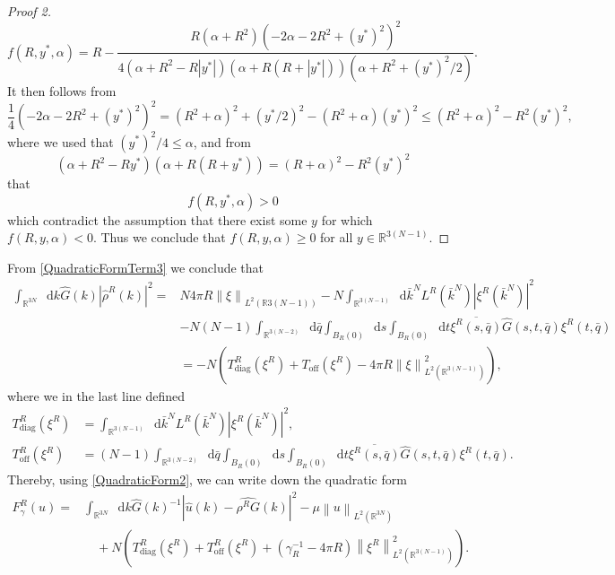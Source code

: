 \documentclass[a4paper,11pt]{article}
\newcommand{\norm}[1]{\left\lVert #1 \right\rVert}
\newcommand{\abs}[1]{\left\lvert #1 \right\rvert}
\newcommand*\diff{\mathop{}\!\mathrm{d}}
\newcommand{\R}{\mathbb{R}}
\numberwithin{equation}{section}
\begin{document}
\begin{proof}[Proof 2]
\begin{equation}
	f(R,y^*,\alpha)=R-\frac{R \left(\alpha +R^2\right) \left(-2 \alpha -2 R^2+(y^*)^2\right)^2}{4 \left(\alpha +R^2-R \abs{y^*}\right) (\alpha +R (R+\abs{y^*})) \left( \alpha + R^2+(y^*)^2/2\right)}.
	\end{equation}
	It then follows from \begin{equation}
	\frac{1}{4}\left(-2 \alpha -2 R^2+(y^*)^2\right)^2=(R^2+\alpha)^2+(y^*/2)^2-(R^2+\alpha)(y^*)^2\leq(R^2+\alpha)^2-R^2(y^*)^2,
	\end{equation}
	where we used that $ (y^*)^2/4\leq\alpha $, and from \begin{equation}
	\left(\alpha +R^2-R y^*\right) (\alpha +R (R+y^*))=(R+\alpha)^2-R^2(y^*)^2
	\end{equation}
	that \begin{equation}
	f(R,y^*,\alpha)> 0
	\end{equation}
	which contradict the assumption that there exist some $ y $ for which $ f(R,y,\alpha)<0 $. Thus we conclude that $ f(R,y,\alpha)\geq0 $ for all $ y\in\R^{3(N-1)} $.
\end{proof}
\vspace{0.5cm}
From \eqref{QuadraticFormTerm3} we conclude that \begin{equation}
\begin{aligned}
\int_{\R^{3N}}\diff k\hat{G}(k)\abs{\hat{\rho}^R(k)}^2=&N4\pi R \norm{\xi}_{L^2(\R{3(N-1)})}-N\int_{\R^{3(N-1)}}\diff \bar{k}^N L^R(\bar{k}^N) \abs{\xi^R(\bar{k}^N)}^2\\&-N(N-1)\int_{\R^{3(N-2)}}\diff \bar{q}\int_{B_R(0)}\diff s\int_{B_R(0)}\diff t \overline{\xi^R(s,\bar{q})}\hat{G}(s,t,\bar{q})\xi^R(t,\bar{q})\\
&= -N\left(T_{\text{diag}}^R(\xi^R)+T_{\text{off}}(\xi^R)-4\pi R\norm{\xi}_{L^2(\R^{3(N-1)})}^2\right),
\end{aligned}
\end{equation}
where we in the last line defined\begin{equation}
\begin{aligned}
T^R_{\text{diag}}(\xi^R)&=\int_{\R^{3(N-1)}}\diff \bar{k}^N L^R(\bar{k}^N) \abs{\xi^R(\bar{k}^N)}^2,\\
T^R_{\text{off}}(\xi^R)&=(N-1)\int_{\R^{3(N-2)}}\diff \bar{q}\int_{B_R(0)}\diff s\int_{B_R(0)}\diff t \overline{\xi^R(s,\bar{q})}\hat{G}(s,t,\bar{q})\xi^R(t,\bar{q}).
\end{aligned}
\end{equation}
Thereby, using \eqref{QuadraticForm2}, we can write down the quadratic form\begin{equation}
\begin{aligned}
F_\gamma^R(u)=&\int_{\R^{3N}}\diff k \hat{G}(k)^{-1}|\hat{u}(k)-\widehat{\rho^R G}(k)|^2-\mu\norm{u}_{L^2(\R^{3N})}\\&\quad+N\left(T^R_{\text{diag}}(\xi^R)+T^R_{\text{off}}(\xi^R)+(\gamma_R^{-1}-4\pi R)\norm{\xi^R}_{L^2(\R^{3(N-1)})}^2\right).
\end{aligned}
\end{equation}
\end{document}
